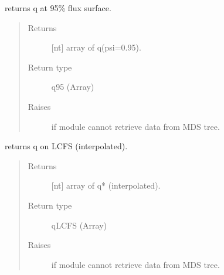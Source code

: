 \documentclass[letterpaper,10pt,english]{sphinxmanual}
\begin{document}
\begin{fulllineitems}
\begin{fulllineitems}
\end{fulllineitems}


\begin{fulllineitems}
\label{\detokenize{eqtools:eqtools.TCVLIUQE.TCVLIUQETree.getQ95}}
returns q at 95\% flux surface.
\begin{quote}\begin{description}
\item[{Returns}] \leavevmode
{[}nt{]} array of q(psi=0.95).

\item[{Return type}] \leavevmode
q95 (Array)

\item[{Raises}] \leavevmode
{} \textendash{} if module cannot retrieve data from MDS tree.

\end{description}\end{quote}

\end{fulllineitems}


\begin{fulllineitems}
\label{\detokenize{eqtools:eqtools.TCVLIUQE.TCVLIUQETree.getQLCFS}}
returns q on LCFS (interpolated).
\begin{quote}\begin{description}
\item[{Returns}] \leavevmode
{[}nt{]} array of q* (interpolated).

\item[{Return type}] \leavevmode
qLCFS (Array)

\item[{Raises}] \leavevmode
{} \textendash{} if module cannot retrieve data from MDS tree.

\end{description}\end{quote}

\end{fulllineitems}


\end{fulllineitems}
\end{document}
